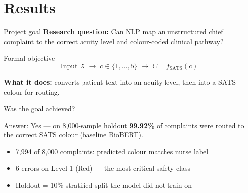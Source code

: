 \section{Results}

\begin{frame}{Project goal}
  \small
  \textbf{Research question:} Can NLP map an unstructured chief complaint to the correct acuity level and colour-coded clinical pathway?

  \vspace{0.15cm}
  \begin{block}{Formal objective}
    \[
      \text{Input } X \;\to\; \hat{c} \in \{1,\ldots,5\} \;\to\; C = f_{\mathrm{SATS}}(\hat{c})
    \]
  \end{block}

  \textbf{What it does:} converts patient text into an acuity level, then into a SATS colour for routing.

\end{frame}

\begin{frame}{Was the goal achieved?}
  \small
  \begin{block}{Answer: Yes --- on 8{,}000-sample holdout}
    \textbf{99.92\%} of complaints were routed to the correct SATS colour (baseline BioBERT).
  \end{block}

  \vspace{0.1cm}
  \begin{itemize}
    \item 7,994 of 8,000 complaints: predicted colour matches nurse label
    \item 6 errors on Level 1 (Red) --- the most critical safety class
    \item Holdout = 10\% stratified split the model did not train on
  \end{itemize}

\end{frame}

